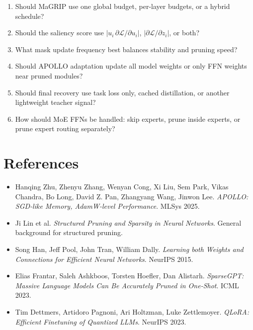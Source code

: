 \documentclass[11pt]{article}
\newcommand{\Loss}{\mathcal{L}}
\begin{document}
\begin{enumerate}[leftmargin=*]
  \item Should MaGRIP use one global budget, per-layer budgets, or a hybrid schedule?
  \item Should the saliency score use $|u_i\,\partial\Loss/\partial u_i|$, $|\partial\Loss/\partial z_i|$, or both?
  \item What mask update frequency best balances stability and pruning speed?
  \item Should APOLLO adaptation update all model weights or only FFN weights near pruned modules?
  \item Should final recovery use task loss only, cached distillation, or another lightweight teacher signal?
  \item How should MoE FFNs be handled: skip experts, prune inside experts, or prune expert routing separately?
\end{enumerate}

\section{References}

\begin{itemize}[leftmargin=*]
  \item Hanqing Zhu, Zhenyu Zhang, Wenyan Cong, Xi Liu, Sem Park, Vikas Chandra, Bo Long, David Z. Pan, Zhangyang Wang, Jinwon Lee. \emph{APOLLO: SGD-like Memory, AdamW-level Performance}. MLSys 2025.
  \item Ji Lin et al. \emph{Structured Pruning and Sparsity in Neural Networks}. General background for structured pruning.
  \item Song Han, Jeff Pool, John Tran, William Dally. \emph{Learning both Weights and Connections for Efficient Neural Networks}. NeurIPS 2015.
  \item Elias Frantar, Saleh Ashkboos, Torsten Hoefler, Dan Alistarh. \emph{SparseGPT: Massive Language Models Can Be Accurately Pruned in One-Shot}. ICML 2023.
  \item Tim Dettmers, Artidoro Pagnoni, Ari Holtzman, Luke Zettlemoyer. \emph{QLoRA: Efficient Finetuning of Quantized LLMs}. NeurIPS 2023.
\end{itemize}
\end{document}
